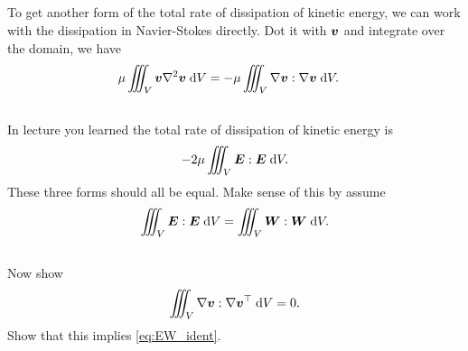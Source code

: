 \documentclass[11pt,letterpaper]{report}
\begin{document}
\subsection{}
To get another form of the total rate of dissipation of kinetic energy, we can work with the dissipation in Navier-Stokes directly. Dot it with $\boldsymbol{v}$ and integrate over the domain, we have
\begin{align}
    \mu \iiint_V \boldsymbol{v}\nabla^2\boldsymbol{v} \;\mathrm{d} V &= -\mu \iiint_V \nabla \boldsymbol{v}:\nabla\boldsymbol{v} \;\mathrm{d} V.
\end{align}

\subsection{}
In lecture you learned the total rate of dissipation of kinetic energy is
\begin{align}
    -2\mu \iiint_V \boldsymbol{E}:\boldsymbol{E} \;\mathrm{d} V.
\end{align}
These three forms should all be equal. Make sense of this by assume 
\begin{align}
    \iiint_V \boldsymbol{E}:\boldsymbol{E} \;\mathrm{d} V = \iiint_V \boldsymbol{W}:\boldsymbol{W} \;\mathrm{d} V.\label{eq:EW_ident}
\end{align}

\subsection{}
Now show
\begin{align}
    \iiint_V \nabla \boldsymbol{v}:\nabla\boldsymbol{v}^\top \;\mathrm{d} V = 0.
\end{align}
Show that this implies \eqref{eq:EW_ident}.
\end{document}
